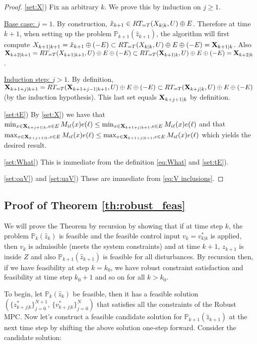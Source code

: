 \begin{proof}
	
\ref{set:X}) 
Fix an arbitrary $k$. We prove this by induction on $j \geq 1$.

\underline{Base case: $j=1$}. By construction, $\hat{x}_{k+1} \in RT_{=T}(X_{k|k},U) \oplus E$.
Therefore at time $k+1$, when setting up the problem $\mathbb{P}_{k+1}(\hat{z}_{k+1})$, the algorithm will first compute
$X_{k+1|k+1} = \hat{x}_{k+1} \oplus (-E)  \subset RT_{=T}(X_{k|k},U) \oplus E \oplus (-E) = \mathbf{X}_{k+1|k}$.
Also 
$\mathbf{X}_{k+2|k+1} = RT_{=T}(X_{k+1|k+1},U) \oplus E \oplus(-E) \subset  RT_{=T}(\mathbf{X}_{k+1|k},U) \oplus E \oplus(-E) = \mathbf{X}_{k+2|k}$.

\underline{Induction step: $j > 1$}.
By definition, $\mathbf{X}_{k+1+j|k+1} = RT_{=T}(\mathbf{X}_{k+1+j-1|k+1},U) \oplus E \oplus (-E) \subset  RT_{=T}(\mathbf{X}_{k+j|k},U) \oplus E \oplus (-E)$ (by the induction hypothesis). This last set equals $\mathbf{X}_{k+j+1|k}$ by definition.

\ref{set:tE}) 	By \ref{set:X}) 
 we have that 
 $ \min_{x \in \mathbf{X}_{k+j+1|k}, e \in E} M_{i\ell}(x)e(\ell) \leq \min_{x \in \mathbf{X}_{k+1+j|k+1}, e \in E} M_{i\ell}(x)e(\ell)$ and that 
 $\max_{x \in \mathbf{X}_{k+j+1|k}, e \in E} M_{i\ell}(x)e(\ell) \leq \max_{x \in \mathbf{X}_{k+1+j|k+1}, e \in E} M_{i\ell}(x)e(\ell)$
 which yields the desired result.
 
 \ref{set:What}) This is immediate from the definition \eqref{eq:What} and \ref{set:tE}).
 
 \ref{set:oaV}) and \ref{set:uaV}) These are immediate from \eqref{eq:V inclusions}.
 
	\end{proof}


\subsection{Proof of Theorem \ref{th:robust_feas}}
\label{sec:proof of thm 1}
We will prove the Theorem by recursion by showing that if at time step $k$, the problem $\mathbb{P}_{k}(\hat{z}_k)$ is feasible and the feasible control input $v_k = v^{*}_{k|k}$ is applied, then $v_k$ is admissible (meets the system constraints) and at time $k+1$, $z_{k+1}$ is inside $Z$ and also $\mathbb{P}_{k+1}(\hat{z}_{k+1})$ is feasible for all disturbances. By recursion then, if we have feasibility at step $k=k_0$, we have robust constraint satisfaction and feasibility at time step $k_0+1$ and so on for all $k>k_0$. 

To begin, let $\mathbb{P}_{k}(\hat{z}_k)$ be feasible, then it has a feasible solution $(\lbrace z^{*}_{k+j|k}\rbrace_{j=0}^{N+1}, \, \lbrace v^{*}_{k+j|k}\rbrace_{j=0}^{N} )$ that satisfies all the constraints of the Robust MPC. Now let's construct a feasible candidate solution for $\mathbb{P}_{k+1}(\hat{z}_{k+1})$ at the next time step by shifting the above solution one-step forward. Consider the candidate solution:


